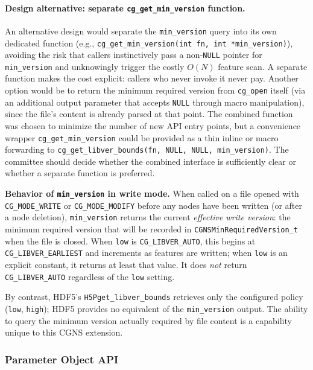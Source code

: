 \documentclass[11pt,letterpaper]{article}
\begin{document}
\paragraph{Design alternative: separate \texttt{cg\_get\_min\_version}
function.}
An alternative design would separate the \texttt{min\_version} query into
its own dedicated function (e.g.,
\texttt{cg\_get\_min\_version(int fn, int *min\_version)}), avoiding the
risk that callers instinctively pass a non-\texttt{NULL} pointer for
\texttt{min\_version} and unknowingly trigger the costly $O(N)$ feature
scan.  A separate function makes the cost explicit: callers who never
invoke it never pay.  Another option would be to return the minimum
required version from \texttt{cg\_open} itself (via an additional output
parameter that accepts \texttt{NULL} through macro manipulation), since
the file's content is already parsed at that point.  The combined
function was chosen to minimize the number of new API entry points, but
a convenience wrapper \texttt{cg\_get\_min\_version} could be provided as
a thin inline or macro forwarding to
\texttt{cg\_get\_libver\_bounds(fn, NULL, NULL, min\_version)}.
The committee should decide whether the combined interface is
sufficiently clear or whether a separate function is preferred.

\textbf{Behavior of \texttt{min\_version} in write mode.}
When called on a file opened with \texttt{CG\_MODE\_WRITE} or
\texttt{CG\_MODE\_MODIFY} before any nodes have been written (or
after a node deletion), \texttt{min\_version} returns the current
\emph{effective write version}: the minimum required version that will be
recorded in \texttt{CGNSMinRequiredVersion\_t} when the file is closed.
When \texttt{low} is \texttt{CG\_LIBVER\_AUTO}, this begins at
\texttt{CG\_LIBVER\_EARLIEST} and increments as features are
written; when \texttt{low} is an explicit constant, it returns at
least that value.  It does \emph{not} return
\texttt{CG\_LIBVER\_AUTO} regardless of the \texttt{low} setting.

By contrast, HDF5's \texttt{H5Pget\_libver\_bounds} retrieves only
the configured policy (\texttt{low}, \texttt{high}); HDF5 provides no
equivalent of the \texttt{min\_version} output.  The ability to query
the minimum version actually required by file content is a capability
unique to this CGNS extension.

\subsubsection{Parameter Object API}
\label{sec:params-api}
\end{document}
